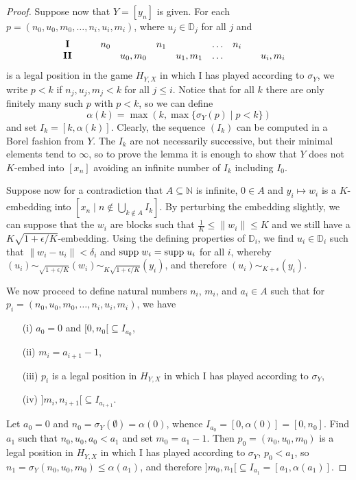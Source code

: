 \documentclass[10pt]{amsart}
\numberwithin{equation}{section}
\begin{document}
\begin{proof}
Suppose now that $Y=[y_n]$ is given.
For each  $p=(n_0,u_0,m_0,\ldots,n_i,u_i,m_i)$, where $u_j\in {\mathbb D}_j$ for all $j$ and
$$
\begin{array}{cccccccccccc}
{\bf I} & & & n_0 &                 & n_1 &                 & \ldots &  n_i& & \\
{\bf II} & & &       & u_0,m_0 &        & u_1, m_1 & \ldots & & & u_i,m_i&
\end{array}
$$
is a legal position in the game $H_{Y,X}$ in which I has played according to
$\sigma_Y$, we write $p<k$ if $n_j,u_j,m_j<k$ for all $j{\ensuremath{\leqslant}} i$. Notice that
for all $k$ there are only finitely many such $p$ with $p<k$, so we can define
$$
\alpha(k)=\max(k,\max\{\sigma_Y(p){ \; \big| \;} p<k\})
$$
and set $I_k=[k,\alpha(k)]$.
Clearly, the sequence $(I_k)$ can be computed in a
Borel fashion from $Y$. The $I_k$ are not necessarily successive, but their
minimal elements tend to $\infty$, so to prove the lemma it is enough to show
that $Y$ does not $K$-embed into $[x_n]$ avoiding an infinite number of $I_k$
including $I_0$.

Suppose now for a contradiction that $A\subseteq {\mathbb N}$ is infinite, $0\in A$ and
$y_i\mapsto w_i$ is a $K$-embedding into $[x_n{ \; \big| \;} n\notin \bigcup_{k\notin
  A}I_k]$. By perturbing the embedding slightly, we can suppose that the $w_i$
are blocks such that $\frac 1K{\ensuremath{\leqslant}} {\lVert{w_i}\rVert}{\ensuremath{\leqslant}} K$ and we still have a
$K\sqrt{1+\epsilon/K}$-embedding. Using the defining properties of ${\mathbb D}_i$, we
find $u_i\in {\mathbb D}_i$ such that ${\lVert{w_i-u_i}\rVert}<\delta_i$ and ${\rm
  supp}\;w_i={\rm supp}\; u_i$ for all $i$, whereby
$(u_i)\sim_{\sqrt{1+\epsilon/K}}(w_i)\sim_{K\sqrt{1+\epsilon/K}}(y_i)$, and
therefore $(u_i) \sim_{K+\epsilon} (y_i)$.

We now proceed to define natural numbers $n_i$, $m_i$, and $a_i\in A$ such that
for $p_i=(n_0,u_0,m_0,\ldots, n_i,u_i,m_i)$, we have
\begin{itemize}
  \item [(i)] $a_0=0$ and $[0,n_0[\subseteq I_{a_0}$,
  \item [(ii)] $m_i=a_{i+1}-1$,
  \item [(iii)] $p_i$ is a legal position in $H_{Y,X}$ in which I has played according to $\sigma_Y$,
  \item [(iv)] $]m_i,n_{i+1}[\subseteq I_{a_{i+1}}$.
\end{itemize}
Let $a_0=0$ and $n_0=\sigma_Y(\emptyset)=\alpha(0)$, whence
$I_{a_0}=[0,\alpha(0)]=[0,n_0]$. Find $a_1$ such that $n_0,u_0,a_0<a_1$ and set
$m_0=a_1-1$. Then $p_0=(n_0,u_0,m_0)$ is a legal position in $H_{Y,X}$ in which
I has played according to $\sigma_Y$, $p_0<a_1$, so
$n_1=\sigma_Y(n_0,u_0,m_0){\ensuremath{\leqslant}} \alpha(a_1)$, and therefore $]m_0,n_1[\subseteq
I_{a_1}=[a_1,\alpha(a_1)]$.


\end{proof}
\end{document}
